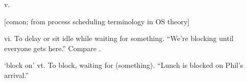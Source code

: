  v.

[comon; from process scheduling terminology in OS theory]
\begin{inparaenum}
\item vi. To delay or sit idle while waiting for something. ``We're blocking
    until everyone gets here.'' Compare .
\item `block on' vt. To block, waiting for (something). ``Lunch is blocked on
    Phil's arrival.''
\end{inparaenum}

